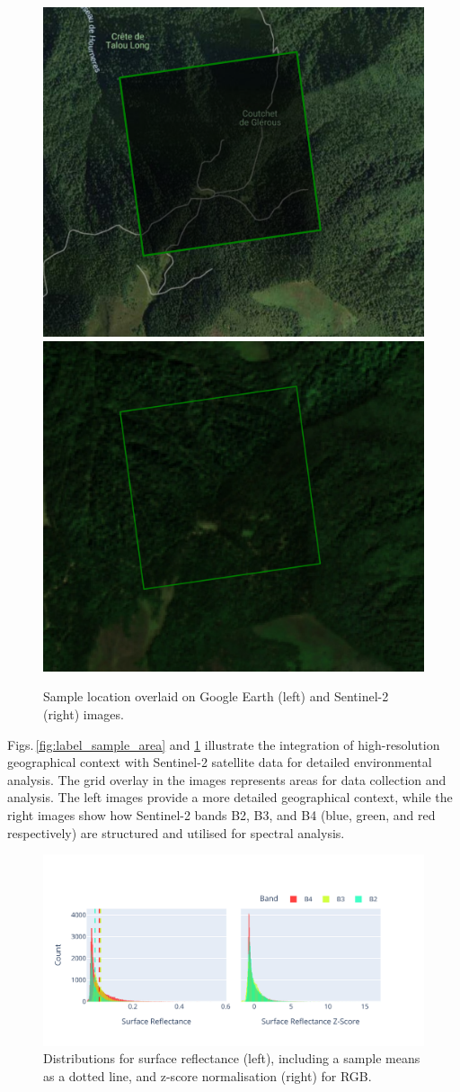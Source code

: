 \begin{figure}[!thb]
    \centering

    \includegraphics[width=0.48\linewidth]{figures/figures_sentinel/sample_earth.png}
    \includegraphics[width=0.48\linewidth]{figures/figures_sentinel/sample_sentinel.png}

    \caption{Sample location overlaid on Google Earth (left) and Sentinel-2 (right) images.}
    \label{fig:label_sample}
\end{figure}

Figs.\,\ref{fig:label_sample_area} and \ref{fig:label_sample} illustrate the integration of high-resolution geographical context with Sentinel-2 satellite data for detailed environmental analysis. The grid overlay in the images represents areas for data collection and analysis. The left images provide a more detailed geographical context, while the right images show how Sentinel-2 bands B2, B3, and B4 (blue, green, and red respectively) are structured and utilised for spectral analysis.


\begin{figure}[ht]
    \centering
    \includegraphics[width=0.98\linewidth, trim={15pt 25pt 10pt 50pt}, clip]{figures/figures_features/bgr_hist.pdf}
    \caption{Distributions for surface reflectance (left), including a sample means as a dotted line, 
    and z-score normalisation (right) for RGB.}
    \label{fig:bgr_hist}
\end{figure}

